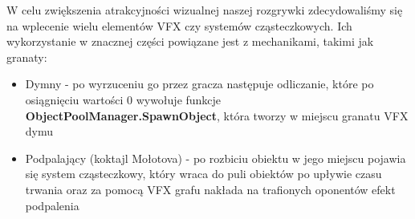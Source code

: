 W celu zwiększenia atrakcyjności wizualnej naszej rozgrywki zdecydowaliśmy się na wplecenie wielu elementów VFX czy systemów cząsteczkowych.
Ich wykorzystanie w znacznej części powiązane jest z mechanikami, takimi jak granaty:
\begin{itemize}
    \item Dymny - po wyrzuceniu go przez gracza następuje odliczanie, które po osiągnięciu wartości 0 wywołuje funkcje \textbf{ObjectPoolManager.SpawnObject}, która tworzy w miejscu granatu VFX dymu
    \item Podpalający (koktajl Mołotova) - po rozbiciu obiektu w jego miejscu pojawia się system cząsteczkowy, który wraca do puli obiektów po upływie czasu trwania oraz za pomocą VFX grafu nakłada na trafionych oponentów efekt podpalenia 
\end{itemize}

